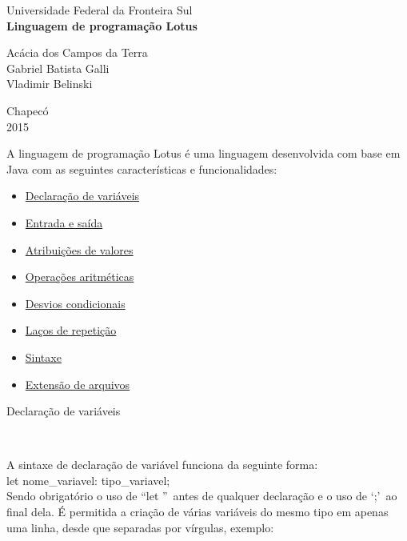 \documentclass[12pt,a4paper]{article}
\begin{document}
\begin{titlepage}
\begin{center}
{\large Universidade Federal da Fronteira Sul}\\[5.5cm]
{\bf \huge Linguagem de programação Lotus}\\[4.9cm]
\end{center}
{\large Acácia dos Campos da Terra}\\
{\large Gabriel Batista Galli}\\
{\large Vladimir Belinski}\\[5.8cm]
\begin{center}
{\large Chapecó}\\[0.1cm]
{\large 2015}
\end{center}
\end{titlepage}

A linguagem de programação Lotus é uma linguagem desenvolvida com base em Java com as seguintes características e funcionalidades:\\

\begin{itemize}
\item \hyperlink{Declaração de variáveis}{Declaração de variáveis}
\item \hyperlink{Entrada e saída}{Entrada e saída}
\item \hyperlink{Atribuições de valores}{Atribuições de valores}
\item \hyperlink{Operações aritméticas}{Operações aritméticas}
\item \hyperlink{Desvios condicionais}{Desvios condicionais}
\item \hyperlink{Laços de repetição}{Laços de repetição}
\item \hyperlink{Sintaxe}{Sintaxe}
\item \hyperlink{Extensão de arquivos}{Extensão de arquivos}\\[15.4cm]
\end{itemize}

\hypertarget{Declaração de variáveis}{\Large{Declaração de variáveis}}\\[0.3cm]
\normalsize

A sintaxe de declaração de variável funciona da seguinte forma:\\

let nome\_variavel: tipo\_variavel;\\

Sendo obrigatório o uso de ``let ''\ antes de qualquer declaração e o uso de `;'\ ao final dela. É permitida a criação de várias variáveis do mesmo tipo em apenas uma linha, desde que separadas por vírgulas, exemplo:\\
\end{document}
